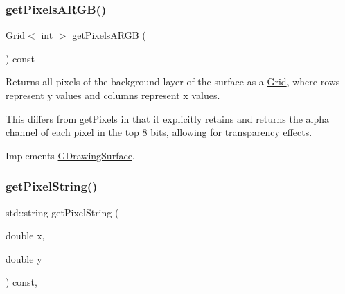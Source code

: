 \mbox{\label{classGForwardDrawingSurface_aca5a19f5f53c5cd29b832a769fde4f68}} 
\subsubsection{\texorpdfstring{get\+Pixels\+A\+R\+G\+B()}{getPixelsARGB()}}
{\footnotesize\ttfamily \mbox{\hyperlink{classGrid}{Grid}}$<$ int $>$ get\+Pixels\+A\+R\+GB (\begin{DoxyParamCaption}{ }\end{DoxyParamCaption}) const\hspace{0.3cm}{\ttfamily [virtual]}}



Returns all pixels of the background layer of the surface as a \mbox{\hyperlink{classGrid}{Grid}}, where rows represent y values and columns represent x values. 

This differs from get\+Pixels in that it explicitly retains and returns the alpha channel of each pixel in the top 8 bits, allowing for transparency effects. 

Implements \mbox{\hyperlink{classGDrawingSurface_a5712954f3edce2e1e4dd3109ffe16e05}{G\+Drawing\+Surface}}.

\mbox{\label{classGDrawingSurface_a8da04ef488ec5fa498fbbffaf50928fd}} 
\subsubsection{\texorpdfstring{get\+Pixel\+String()}{getPixelString()}}
{\footnotesize\ttfamily std\+::string get\+Pixel\+String (\begin{DoxyParamCaption}\item[{double}]{x,  }\item[{double}]{y }\end{DoxyParamCaption}) const\hspace{0.3cm}{\ttfamily [virtual]}, {\ttfamily [inherited]}}



